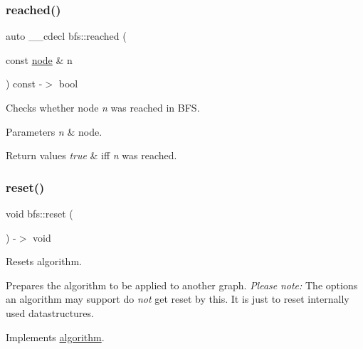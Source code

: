 \subsubsection{\texorpdfstring{reached()}{reached()}}
{\footnotesize\ttfamily auto \+\_\+\+\_\+cdecl bfs\+::reached (\begin{DoxyParamCaption}\item[{const \mbox{\hyperlink{classnode}{node}} \&}]{n }\end{DoxyParamCaption}) const -\/$>$ bool
	\hspace{0.3cm}{\ttfamily [inline]}}



Checks whether node {\itshape n} was reached in B\+FS. 


\begin{DoxyParams}{Parameters}
{\em n} & node. \\
\hline
\end{DoxyParams}

\begin{DoxyRetVals}{Return values}
{\em true} & iff {\itshape n} was reached. \\
\hline
\end{DoxyRetVals}
\mbox{\label{classbfs_a9f93abba43ea1fa130a4c26b32793f2f}} 
\subsubsection{\texorpdfstring{reset()}{reset()}}
{\footnotesize\ttfamily void bfs\+::reset (\begin{DoxyParamCaption}{ }\end{DoxyParamCaption}) -\/$>$  void\hspace{0.3cm}{\ttfamily [virtual]}}



Resets algorithm. 

Prepares the algorithm to be applied to another graph. {\itshape Please} {\itshape note\+:} The options an algorithm may support do {\itshape not} get reset by this. It is just to reset internally used datastructures. 

Implements \mbox{\hyperlink{classalgorithm_aea645f2e39976a477c8f8564656fd1b6}{algorithm}}.

\mbox{\label{classbfs_a8ba1e13916302d68faafc5c5098b04fe}} 
